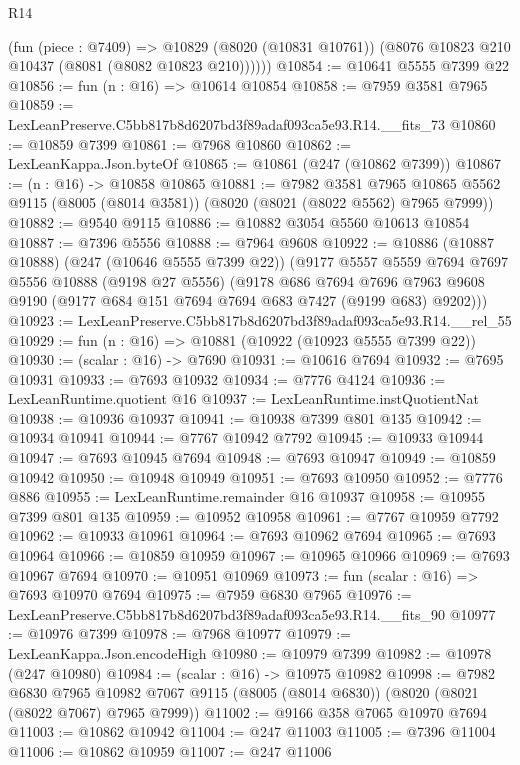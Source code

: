 \begin{lexlean}{R14}
\begin{coremodule}
        (fun (piece : @7409) =>
        @10829 (@8020 (@10831 @10761)) (@8076 @10823 @210 @10437 (@8081 (@8082 @10823 @210))))))
@10854 := @10641 @5555 @7399 @22
@10856 := fun (n : @16) => @10614 @10854
@10858 := @7959 @3581 @7965
@10859 := LexLeanPreserve.C5bb817b8d6207bd3f89adaf093ca5e93.R14.__fits_73
@10860 := @10859 @7399
@10861 := @7968 @10860
@10862 := LexLeanKappa.Json.byteOf
@10865 := @10861 (@247 (@10862 @7399))
@10867 := (n : @16) -> @10858 @10865
@10881 := @7982
    @3581
    @7965
    @10865
    @5562
    @9115
    (@8005 (@8014 @3581))
    (@8020 (@8021 (@8022 @5562) @7965 @7999))
@10882 := @9540 @9115
@10886 := @10882 @3054 @5560 @10613 @10854
@10887 := @7396 @5556
@10888 := @7964 @9608
@10922 := @10886
    (@10887 @10888)
    (@247 (@10646 @5555 @7399 @22))
    (@9177
      @5557
      @5559
      @7694
      @7697
      @5556
      @10888
      (@9198 @27 @5556)
      (@9178
        @686
        @7694
        @7696
        @7963
        @9608
        @9190
        (@9177 @684 @151 @7694 @7694 @683 @7427 (@9199 @683) @9202)))
@10923 := LexLeanPreserve.C5bb817b8d6207bd3f89adaf093ca5e93.R14.__rel_55
@10929 := fun (n : @16) => @10881 (@10922 (@10923 @5555 @7399 @22))
@10930 := (scalar : @16) -> @7690
@10931 := @10616 @7694
@10932 := @7695 @10931
@10933 := @7693 @10932
@10934 := @7776 @4124
@10936 := LexLeanRuntime.quotient @16
@10937 := LexLeanRuntime.instQuotientNat
@10938 := @10936 @10937
@10941 := @10938 @7399 @801 @135
@10942 := @10934 @10941
@10944 := @7767 @10942 @7792
@10945 := @10933 @10944
@10947 := @7693 @10945 @7694
@10948 := @7693 @10947
@10949 := @10859 @10942
@10950 := @10948 @10949
@10951 := @7693 @10950
@10952 := @7776 @886
@10955 := LexLeanRuntime.remainder @16 @10937
@10958 := @10955 @7399 @801 @135
@10959 := @10952 @10958
@10961 := @7767 @10959 @7792
@10962 := @10933 @10961
@10964 := @7693 @10962 @7694
@10965 := @7693 @10964
@10966 := @10859 @10959
@10967 := @10965 @10966
@10969 := @7693 @10967 @7694
@10970 := @10951 @10969
@10973 := fun (scalar : @16) => @7693 @10970 @7694
@10975 := @7959 @6830 @7965
@10976 := LexLeanPreserve.C5bb817b8d6207bd3f89adaf093ca5e93.R14.__fits_90
@10977 := @10976 @7399
@10978 := @7968 @10977
@10979 := LexLeanKappa.Json.encodeHigh
@10980 := @10979 @7399
@10982 := @10978 (@247 @10980)
@10984 := (scalar : @16) -> @10975 @10982
@10998 := @7982
    @6830
    @7965
    @10982
    @7067
    @9115
    (@8005 (@8014 @6830))
    (@8020 (@8021 (@8022 @7067) @7965 @7999))
@11002 := @9166 @358 @7065 @10970 @7694
@11003 := @10862 @10942
@11004 := @247 @11003
@11005 := @7396 @11004
@11006 := @10862 @10959
@11007 := @247 @11006

\end{coremodule}
\end{lexlean}
